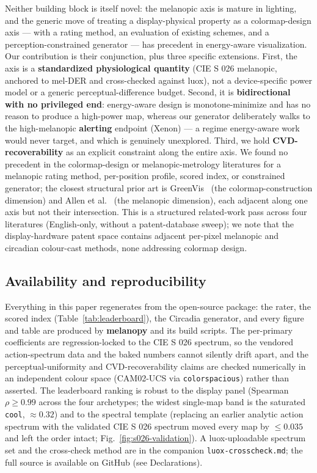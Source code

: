 \documentclass[10pt,a4paper,twocolumn]{article}
\begin{document}
\par
Neither building block is itself novel: the melanopic axis is mature in lighting, and the generic move of treating a display-physical property as a colormap-design axis --- with a rating method, an evaluation of existing schemes, and a perception-constrained generator --- has precedent in energy-aware visualization.
Our contribution is their conjunction, plus three specific extensions.
First, the axis is a \textbf{standardized physiological quantity} (CIE S 026 melanopic, anchored to mel-DER and cross-checked against luox), not a device-specific power model or a generic perceptual-difference budget.
Second, it is \textbf{bidirectional with no privileged end}: energy-aware design is monotone-minimize and has no reason to produce a high-power map, whereas our generator deliberately walks to the high-melanopic \textbf{alerting} endpoint (Xenon) --- a regime energy-aware work would never target, and which is genuinely unexplored.
Third, we hold \textbf{CVD-recoverability} as an explicit constraint along the entire axis.
We found no precedent in the colormap-design or melanopic-metrology literatures for a melanopic rating method, per-position profile, scored index, or constrained generator; the closest structural prior art is GreenVis~\cite{wang2012greenvis} (the colormap-construction dimension) and Allen et al.~\cite{allen2018metamerism} (the melanopic dimension), each adjacent along one axis but not their intersection.
This is a structured related-work pass across four literatures (English-only, without a patent-database sweep); we note that the display-hardware patent space contains adjacent per-pixel melanopic and circadian colour-cast methods, none addressing colormap design.

\subsection{Availability and reproducibility}\label{sec:reproducibility}

Everything in this paper regenerates from the open-source package: the rater, the scored index (Table~\ref{tab:leaderboard}), the Circadia generator, and every figure and table are produced by \textbf{melanopy} and its build scripts.
The per-primary coefficients are regression-locked to the CIE S 026 spectrum, so the vendored action-spectrum data and the baked numbers cannot silently drift apart, and the perceptual-uniformity and CVD-recoverability claims are checked numerically in an independent colour space (CAM02-UCS via \texttt{colorspacious}) rather than asserted.
The leaderboard ranking is robust to the display panel (Spearman $\rho \geq 0.99$ across the four archetypes; the widest single-map band is the saturated \texttt{cool}, $\approx 0.32$) and to the spectral template (replacing an earlier analytic action spectrum with the validated CIE S 026 spectrum moved every map by $\leq 0.035$ and left the order intact; Fig.~\ref{fig:s026-validation}).
A luox-uploadable spectrum set and the cross-check method are in the companion \texttt{luox-crosscheck.md}; the full source is available on GitHub (see Declarations).
\end{document}
